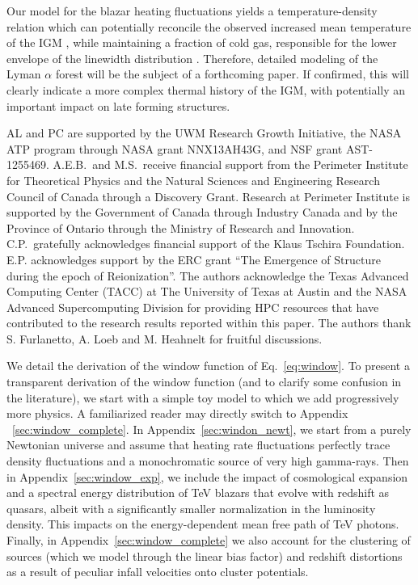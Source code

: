 \documentclass[numberedappendix]{emulateapj}
\begin{document}
Our model for the blazar heating fluctuations yields a temperature-density relation which can potentially reconcile the observed increased mean temperature of the IGM \citep{2014MNRAS.441.1916B}, while maintaining a fraction of cold gas, responsible for the lower envelope of the linewidth distribution \citep{2012ApJ...757L..30R}. Therefore, detailed modeling of the Lyman $\alpha$ forest will be the subject of a forthcoming paper. If confirmed, this will clearly indicate a more complex thermal history of the IGM, with potentially an important impact on late forming structures.
\begin{acknowledgements}
AL and PC are supported by the UWM Research Growth Initiative, the NASA ATP
program through NASA grant NNX13AH43G, and NSF grant AST-1255469.
A.E.B.~and M.S.~receive financial support from the Perimeter
Institute for Theoretical Physics and the Natural Sciences and
Engineering Research Council of Canada through a Discovery Grant.
Research at Perimeter Institute is supported by the Government of
Canada through Industry Canada and by the Province of Ontario through
the Ministry of Research and Innovation.
C.P.~gratefully acknowledges
financial support of the Klaus Tschira Foundation. E.P. acknowledges support by the ERC grant ``The Emergence of Structure during the epoch of Reionization''.
The authors acknowledge the Texas Advanced Computing Center (TACC) at The University of Texas at Austin and the NASA Advanced Supercomputing Division for providing HPC resources that have contributed to the research results reported within this paper. The authors thank S. Furlanetto, A. Loeb and M. Heahnelt for fruitful discussions. 
\end{acknowledgements}

\appendix
We detail the derivation of the window function of Eq.~\eqref{eq:window}. To present a transparent derivation of the window function (and to clarify some confusion in the literature), we start with a simple toy model to which we add progressively more physics. A familiarized reader may directly switch to Appendix ~\ref{sec:window_complete}. In Appendix~\ref{sec:windon_newt}, we start from a purely Newtonian universe and assume that heating rate fluctuations perfectly trace density fluctuations and a monochromatic source of very high gamma-rays. Then in Appendix~\ref{sec:window_exp}, we include the impact of cosmological expansion and a spectral energy distribution of TeV blazars that evolve with redshift as quasars, albeit with a significantly smaller normalization in the luminosity density. This impacts on the energy-dependent mean free path of TeV photons. Finally, in Appendix~\ref{sec:window_complete} we also account for the clustering of sources (which we model through the linear bias factor) and redshift distortions as a result of peculiar infall velocities onto cluster potentials. \\
\end{document}
